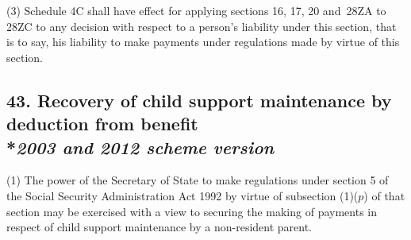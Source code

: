 \documentclass[12pt,a4paper]{article}
\begin{document}
(3) Schedule 4C shall have effect for applying sections 16, 17, 20 and~28ZA to 28ZC to any decision with respect to a person’s liability under this section, that is to say, his liability to make payments under regulations made by virtue of this section.


\subsection[43. Recovery of child support maintenance by deduction from benefit --- \emph{2003 and 2012 scheme version}]{43. Recovery of child support maintenance by deduction from benefit\\*\emph{2003 and 2012 scheme version}}

%
%

(1) The power of the Secretary of State to make regulations under section 5 of the Social Security Administration Act 1992 by virtue of subsection (1)($p$) of that section may be exercised with a view to securing the making of payments in respect of child support maintenance by a non-resident parent.
\end{document}
